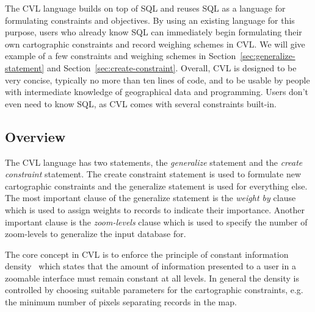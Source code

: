 The CVL language builds on top of SQL and reuses SQL as a language for formulating constraints and objectives. By using an existing language for this purpose, users who already know SQL can immediately begin formulating their own cartographic constraints and record weighing schemes in CVL. We will give example of a few constraints and weighing schemes in Section~\ref{sec:generalize-statement} and Section~\ref{sec:create-constraint}. Overall, CVL is designed to be very concise, typically no more than ten lines of code, and to be usable by people with intermediate knowledge of geographical data and programming. Users don't even need to know SQL, as CVL comes with several constraints built-in.





\subsection{Overview}
The CVL language has two statements, the \emph{generalize} statement and the \emph{create constraint} statement. The create constraint statement is used to formulate new cartographic constraints and the generalize statement is used for everything else. The most important clause of the generalize statement is the \emph{weight by} clause which is used to assign weights to records to indicate their importance. Another important clause is the \emph{zoom-levels} clause which is used to specify the number of zoom-levels to generalize the input database for.

The core concept in CVL is to enforce the principle of constant information density~\cite{toepfer} which states that the amount of information presented to a user in a zoomable interface must remain constant at all levels. In general the density is controlled by choosing suitable parameters for the cartographic constraints, e.g. the minimum number of pixels separating records in the map.

